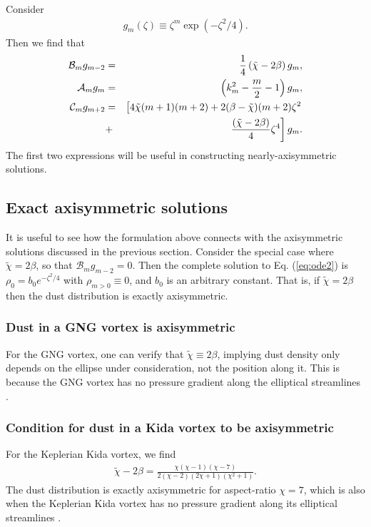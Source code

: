 \documentclass[apj]{emulateapj}
\newcommand{\Eq}[1]{Eq. (\ref{#1})}
\newcommand{\eq}[1]{\Eq{#1}}
\newcommand{\beqn}{\begin{eqnarray}}
\newcommand{\eeqn}{\end{eqnarray}}
\newcommand{\tilchi}{\tilde\chi}
\begin{document}
Consider 
\begin{align}
	g_m(\zeta) \equiv \zeta^m\exp{(-\zeta^2/4)}.
\end{align}
Then we find that 
\beqn
\mathcal{B}_mg_{m-2} &=&\frac{1}{4}\left(\tilchi - 2\beta\right)g_m,\\
\mathcal{A}_mg_m &=& \left(k_m^2 - \frac{m}{2} - 1\right)g_m,\\
\mathcal{C}_mg_{m+2}&=& \left[4\tilchi(m+1)(m+2) +2(\beta-\tilchi)(m+2)\zeta^2 \right.
\notag\\ &+&\left. \frac{\left(\tilchi - 2\beta\right)}{4}\zeta^4\right]g_m. 
\eeqn
The first two expressions will be useful in constructing nearly-axisymmetric solutions. 

\subsection{Exact axisymmetric solutions}
It is useful to see how the formulation above connects with the  axisymmetric solutions discussed in the previous section.  Consider the special case where $\tilchi = 2\beta$, so that 
$\mathcal{B}_mg_{m-2} = 0.$
Then the complete solution to \eq{eq:ode2} is $\rho_0 = b_0e^{-\zeta^2/4}$ with $\rho_{m>0} \equiv 0$, and $b_0$ is an arbitrary constant. That is, if $\tilchi=2\beta$ then the dust distribution is exactly axisymmetric. 

\subsubsection{Dust in a GNG vortex is axisymmetric}
For the GNG vortex, one can verify that $\tilchi\equiv 2\beta$, implying dust density only depends on the ellipse under consideration, not the position along it. This is because the GNG vortex has no pressure gradient along the elliptical streamlines \citep{Chang-Oishi10}. 

\subsubsection{Condition for dust in a Kida vortex to be axisymmetric}
For the Keplerian Kida vortex, we find
\begin{align}
\tilchi - 2\beta = \frac{\chi(\chi-1)(\chi-7)}{2(\chi-2)(2\chi+1)(\chi^2+1)}.
\end{align}
The dust distribution is exactly axisymmetric for aspect-ratio $\chi=7$, which is also when the Keplerian Kida vortex has no pressure gradient along its elliptical streamlines \citep{Chang-Oishi10}. 
\end{document}

